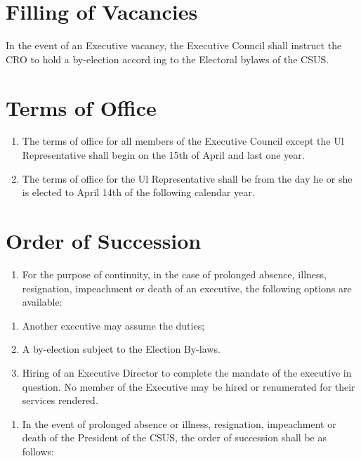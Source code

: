\section{Filling of Vacancies}\label{filling-of-vacancies}

In the event of an Executive vacancy, the Executive Council shall
instruct the CRO to hold a by-election accord ing to the Electoral
bylaws of the CSUS.

\section{Terms of Office}\label{terms-of-office}

\begin{enumerate}
\def\labelenumi{\arabic{enumi}.}
\tightlist
\item
  The terms of office for all members of the Executive Council except
  the Ul Representative shall begin on the 15th of April and last one
  year.
\item
  The terms of office for the Ul Representative shall be from the day he
  or she is elected to April 14th of the following calendar year.
\end{enumerate}

\section{Order of Succession}\label{order-of-succession}

\begin{enumerate}
\def\labelenumi{\arabic{enumi}.}
\tightlist
\item
  For the purpose of continuity, in the case of prolonged absence,
  illness, resignation, impeachment or death of an executive, the
  following options are available:
\end{enumerate}

\begin{enumerate}
\def\labelenumi{(\alph{enumi})}
\tightlist
\item
  Another executive may assume the duties;
\item
  A by-election subject to the Election By-laws.
\item
  Hiring of an Executive Director to complete the mandate of the
  executive in question. No member of the Executive may be hired or
  renumerated for their services rendered.
\end{enumerate}

\begin{enumerate}
\def\labelenumi{\arabic{enumi}.}
\setcounter{enumi}{1}
\tightlist
\item
  In the event of prolonged absence or illness, resignation, impeachment
  or death of the President of the CSUS, the order of succession shall
  be as follows:
\end{enumerate}

